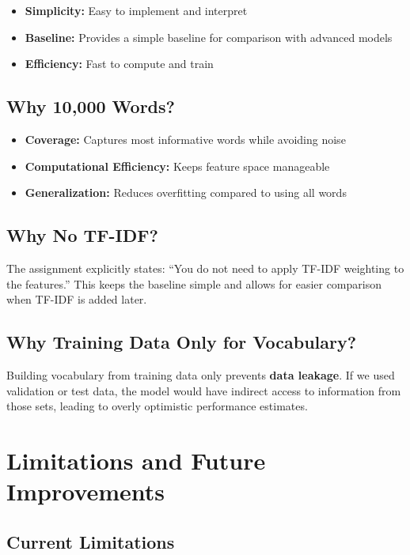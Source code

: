 \documentclass[11pt,a4paper]{article}
\begin{document}
\begin{itemize}
    \item \textbf{Simplicity:} Easy to implement and interpret
    \item \textbf{Baseline:} Provides a simple baseline for comparison with advanced models
    \item \textbf{Efficiency:} Fast to compute and train
\end{itemize}

\subsection{Why 10,000 Words?}

\begin{itemize}
    \item \textbf{Coverage:} Captures most informative words while avoiding noise
    \item \textbf{Computational Efficiency:} Keeps feature space manageable
    \item \textbf{Generalization:} Reduces overfitting compared to using all words
\end{itemize}

\subsection{Why No TF-IDF?}

The assignment explicitly states: ``You do not need to apply TF-IDF weighting to the features.'' This keeps the baseline simple and allows for easier comparison when TF-IDF is added later.

\subsection{Why Training Data Only for Vocabulary?}

Building vocabulary from training data only prevents \textbf{data leakage}. If we used validation or test data, the model would have indirect access to information from those sets, leading to overly optimistic performance estimates.

\section{Limitations and Future Improvements}

\subsection{Current Limitations}
\end{document}
